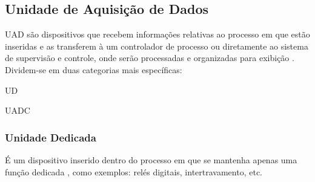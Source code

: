        \begin{figure}[!h]
	    \end{figure}
        
    \subsection{Unidade de Aquisição de Dados}
    \label{sec:uad}

        \gls{UAD} são dispositivos que recebem informações relativas ao processo em que estão inseridas e as transferem à um controlador de processo ou diretamente ao sistema de supervisão e controle, onde serão processadas e organizadas para exibição  \cite{mamede-instalacoes}. Dividem-se em duas categorias mais específicas:
        
        \begin{alineascomponto}
        	\item \gls{UD}
        	\item \gls{UADC}
        \end{alineascomponto}
        
    \subsubsection{Unidade Dedicada}
    \label{sec:ud}

    É um dispositivo inserido dentro do processo em que se mantenha apenas uma função dedicada  \cite{mamede-instalacoes}, como exemplos: relés digitais, intertravamento, etc.

